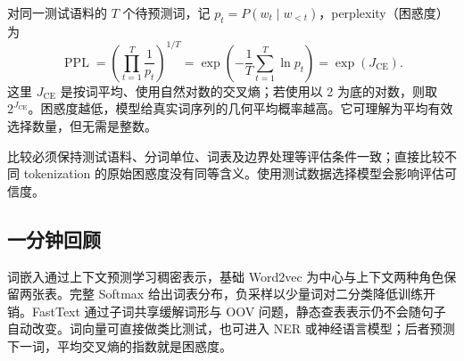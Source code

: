 对同一测试语料的 $T$ 个待预测词，记 $p_t=P(w_t\mid w_{<t})$，perplexity（困惑度）为
\[
  \operatorname{PPL}
   =\left(\prod_{t=1}^{T}\frac1{p_t}\right)^{1/T}
   =\exp\left(-\frac1T\sum_{t=1}^{T}\ln p_t\right)
   =\exp(J_{\mathrm{CE}}).
\]
这里 $J_{\mathrm{CE}}$ 是按词平均、使用自然对数的交叉熵；若使用以 2 为底的对数，则取 $2^{J_{\mathrm{CE}}}$。困惑度越低，模型给真实词序列的几何平均概率越高。它可理解为平均有效选择数量，但无需是整数。

比较必须保持测试语料、分词单位、词表及边界处理等评估条件一致；直接比较不同 tokenization 的原始困惑度没有同等含义。使用测试数据选择模型会影响评估可信度。

\subsection{一分钟回顾}

词嵌入通过上下文预测学习稠密表示，基础 Word2vec 为中心与上下文两种角色保留两张表。完整 Softmax 给出词表分布，负采样以少量词对二分类降低训练开销。FastText 通过子词共享缓解词形与 OOV 问题，静态查表表示仍不会随句子自动改变。词向量可直接做类比测试，也可进入 NER 或神经语言模型；后者预测下一词，平均交叉熵的指数就是困惑度。
